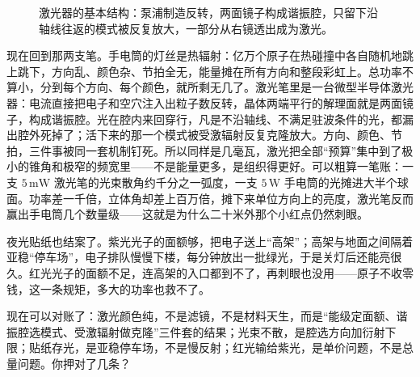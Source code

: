 \begin{figure}[htbp]
\centering
{}
\caption{激光器的基本结构：泵浦制造反转，两面镜子构成谐振腔，只留下沿轴线往返的模式被反复放大，一部分从右镜透出成为激光。}
\end{figure}


\begin{mainline}
现在回到那两支笔。手电筒的灯丝是热辐射：亿万个原子在热碰撞中各自随机地跳上跳下，方向乱、颜色杂、节拍全无，能量摊在所有方向和整段彩虹上。总功率不算小，分到每个方向、每个颜色，就所剩无几了。激光笔里是一台微型半导体激光器：电流直接把电子和空穴注入出粒子数反转，晶体两端平行的解理面就是两面镜子，构成谐振腔。光在腔内来回穿行，凡是不沿轴线、不满足驻波条件的光，都漏出腔外死掉了；活下来的那一个模式被受激辐射反复克隆放大。方向、颜色、节拍，三件事被同一套机制钉死。所以同样是几毫瓦，激光把全部“预算”集中到了极小的锥角和极窄的频宽里——不是能量更多，是组织得更好。可以粗算一笔账：一支 \(5\,\mathrm{mW}\) 激光笔的光束散角约千分之一弧度，一支 \(5\,\mathrm{W}\) 手电筒的光摊进大半个球面。功率差一千倍，立体角却差上百万倍，摊下来单位方向上的亮度，激光笔反而赢出手电筒几个数量级——这就是为什么二十米外那个小红点仍然刺眼。

夜光贴纸也结案了。紫光光子的面额够，把电子送上“高架”；高架与地面之间隔着亚稳“停车场”，电子排队慢慢下楼，每分钟放出一批绿光，于是关灯后还能亮很久。红光光子的面额不足，连高架的入口都到不了，再刺眼也没用——原子不收零钱，这一条规矩，多大的功率也救不了。

现在可以对账了：激光颜色纯，不是滤镜，不是材料天生，而是“能级定面额、谐振腔选模式、受激辐射做克隆”三件套的结果；光束不散，是腔选方向加衍射下限；贴纸存光，是亚稳停车场，不是慢反射；红光输给紫光，是单价问题，不是总量问题。你押对了几条？
\end{mainline}


